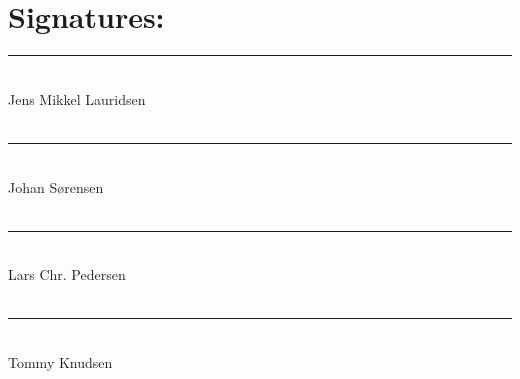 \chapter*{Signatures:}

\noindent\rule{8cm}{0.03cm}\\
Jens Mikkel Lauridsen\\
\\
\noindent\rule{8cm}{0.03cm}\\
Johan Sørensen\\
\\
\noindent\rule{8cm}{0.03cm}\\ 
Lars Chr. Pedersen\\ 
\\
\noindent\rule{8cm}{0.03cm}\\
Tommy Knudsen\\
